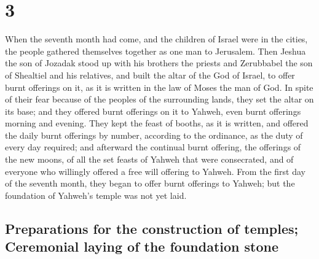 \hypertarget{section-2}{%
\section{3}\label{section-2}}

 When the seventh month had come, and the children of
Israel were in the cities, the people gathered themselves together as
one man to Jerusalem.  Then Jeshua the son of Jozadak
stood up with his brothers the priests and Zerubbabel the son of
Shealtiel and his relatives, and built the altar of the God of Israel,
to offer burnt offerings on it, as it is written in the law of Moses the
man of God.  In spite of their fear because of the peoples
of the surrounding lands, they set the altar on its base; and they
offered burnt offerings on it to Yahweh, even burnt offerings morning
and evening.  They kept the feast of booths, as it is
written, and offered the daily burnt offerings by number, according to
the ordinance, as the duty of every day required;  and
afterward the continual burnt offering, the offerings of the new moons,
of all the set feasts of Yahweh that were consecrated, and of everyone
who willingly offered a free will offering to Yahweh. 
From the first day of the seventh month, they began to offer burnt
offerings to Yahweh; but the foundation of Yahweh's temple was not yet
laid.

\hypertarget{preparations-for-the-construction-of-temples-ceremonial-laying-of-the-foundation-stone}{%
\subsection{Preparations for the construction of temples; Ceremonial
laying of the foundation
stone}\label{preparations-for-the-construction-of-temples-ceremonial-laying-of-the-foundation-stone}}


